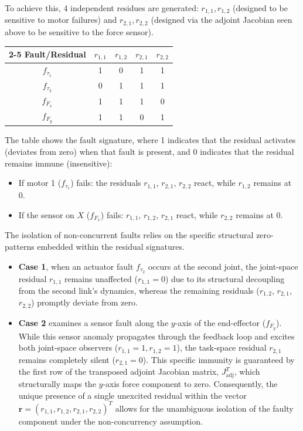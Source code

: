 \documentclass[10pt, a4paper]{report}
\begin{document}
To achieve this, 4 independent residues are generated: $r_{1,1}, r_{1,2}$ (designed to be sensitive to motor failures) and $r_{2,1}, r_{2,2}$ (designed via the adjoint Jacobian seen above to be sensitive to the force sensor).
\begin{table}[H]
    \centering
\begin{tabular}{c|c|c|c|c|}
\cline{2-5}
Fault/Residual                     & $r_{1,1}$ & $r_{1,2}$ & $r_{2,1}$ & $r_{2,2}$ \\ \hline
\multicolumn{1}{|c|}{$f_{\tau_1}$} & 1         & 0         & 1         & 1         \\ \hline
\multicolumn{1}{|c|}{$f_{\tau_2}$} & 0         & 1         & 1         & 1         \\ \hline
\multicolumn{1}{|c|}{$f_{F_x}$}    & 1         & 1         & 1         & 0         \\ \hline
\multicolumn{1}{|c|}{$f_{F_y}$}    & 1         & 1         & 0         & 1         \\ \hline
\end{tabular}
\end{table}
The table shows the fault signature, where 1 indicates that the residual activates (deviates from zero) when that fault is present, and 0 indicates that the residual remains immune (insensitive):\begin{itemize}
    \item If motor 1 ($f_{\tau_1}$) fails: the residuals $r_{1,1}$, $r_{2,1}$, $r_{2,2}$ react, while $r_{1,2}$ remains at 0.
    \item If the sensor on $X$ ($f_{F_x}$) fails: $r_{1,1}$, $r_{1,2}$, $r_{2,1}$ react, while $r_{2,2}$ remains at 0.
\end{itemize}
The isolation of non-concurrent faults relies on the specific structural zero-patterns embedded within the residual signatures. 
\begin{itemize}
\item\textbf{Case 1}, when an actuator fault $f_{\tau_2}$ occurs at the second joint, the joint-space residual $r_{1,1}$ remains unaffected ($r_{1,1} = 0$) due to its structural decoupling from the second link's dynamics, whereas the remaining residuals ($r_{1,2}$, $r_{2,1}$, $r_{2,2}$) promptly deviate from zero. 
\item \textbf{Case 2} examines a sensor fault along the $y$-axis of the end-effector ($f_{F_y}$). While this sensor anomaly propagates through the feedback loop and excites both joint-space observers ($r_{1,1} = 1, r_{1,2} = 1$), the task-space residual $r_{2,1}$ remains completely silent ($r_{2,1} = 0$). This specific immunity is guaranteed by the first row of the transposed adjoint Jacobian matrix, $J^T_{\text{adj}}$, which structurally maps the $y$-axis force component to zero. 
Consequently, the unique presence of a single unexcited residual within the vector $\mathbf r = (r_{1,1}, r_{1,2}, r_{2,1}, r_{2,2})^T$ allows for the unambiguous isolation of the faulty component under the non-concurrency assumption.
\end{itemize}
\end{document}
